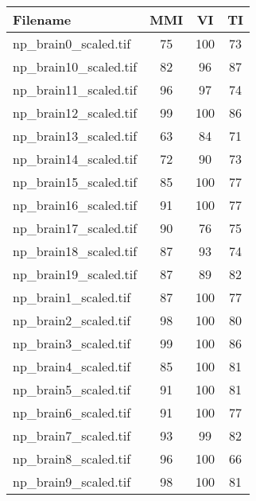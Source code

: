 \begin{tabular}{lccc}
\hline
 Filename              & MMI & VI  & TI \\ \hline \hline
 np\_brain0\_scaled.tif  & 75  & 100 & 73 \\
 np\_brain10\_scaled.tif & 82  & 96  & 87 \\
 np\_brain11\_scaled.tif & 96  & 97  & 74 \\
 np\_brain12\_scaled.tif & 99  & 100 & 86 \\
 np\_brain13\_scaled.tif & 63  & 84  & 71 \\
 np\_brain14\_scaled.tif & 72  & 90  & 73 \\
 np\_brain15\_scaled.tif & 85  & 100 & 77 \\
 np\_brain16\_scaled.tif & 91  & 100 & 77 \\
 np\_brain17\_scaled.tif & 90  & 76  & 75 \\
 np\_brain18\_scaled.tif & 87  & 93  & 74 \\
 np\_brain19\_scaled.tif & 87  & 89  & 82 \\
 np\_brain1\_scaled.tif  & 87  & 100 & 77 \\
 np\_brain2\_scaled.tif  & 98  & 100 & 80 \\
 np\_brain3\_scaled.tif  & 99  & 100 & 86 \\
 np\_brain4\_scaled.tif  & 85  & 100 & 81 \\
 np\_brain5\_scaled.tif  & 91  & 100 & 81 \\
 np\_brain6\_scaled.tif  & 91  & 100 & 77 \\
 np\_brain7\_scaled.tif  & 93  & 99  & 82 \\
 np\_brain8\_scaled.tif  & 96  & 100 & 66 \\
 np\_brain9\_scaled.tif  & 98  & 100 & 81 \\
\hline
\end{tabular}